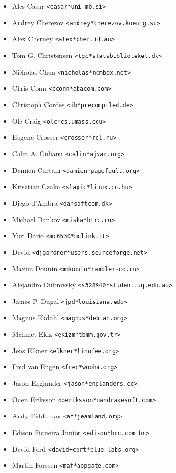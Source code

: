 \documentclass[a4paper,titlepage,12pt]{article}
\newcommand{\email}[1]{\texttt{#1}}
\begin{document}
\begin{itemize}
	\item Ales Casar \email{<casar*uni-mb.si>}
	\item Andrey Cherezov \email{<andrey*cherezov.koenig.su>}
	\item Alex Cherney \email{<alex*cher.id.au>}
	\item Tom G. Christensen \email{<tgc*statsbiblioteket.dk>}
	\item Nicholas Chua \email{<nicholas*ncmbox.net>}
	\item Chris Conn \email{<cconn*abacom.com>}
	\item Christoph Cordes \email{<ib*precompiled.de>}
	\item Ole Craig \email{<olc*cs.umass.edu>}
	\item Eugene Crosser \email{<crosser*rol.ru>}
	\item Calin A. Culianu \email{<calin*ajvar.org>}
	\item Damien Curtain \email{<damien*pagefault.org>}
	\item Krisztian Czako \email{<slapic*linux.co.hu>}
	\item Diego d'Ambra \email{<da*softcom.dk>}
	\item Michael Dankov \email{<misha*btrc.ru>}
	\item Yuri Dario \email{<mc6530*mclink.it>}
	\item David \email{<djgardner*users.sourceforge.net>}
	\item Maxim Dounin \email{<mdounin*rambler-co.ru>}
	\item Alejandro Dubrovsky \email{<s328940*student.uq.edu.au>}
	\item James P. Dugal \email{<jpd*louisiana.edu>}
	\item Magnus Ekdahl \email{<magnus*debian.org>}
	\item Mehmet Ekiz \email{<ekizm*tbmm.gov.tr>}
	\item Jens Elkner \email{<elkner*linofee.org>}
	\item Fred van Engen \email{<fred*wooha.org>}
	\item Jason Englander \email{<jason*englanders.cc>}
	\item Oden Eriksson \email{<oeriksson*mandrakesoft.com>}
	\item Andy Fiddaman \email{<af*jeamland.org>}
	\item Edison Figueira Junior \email{<edison*brc.com.br>}
	\item David Ford \email{<david+cert*blue-labs.org>}
	\item Martin Forssen \email{<maf*appgate.com>}

\end{itemize}
\end{document}
